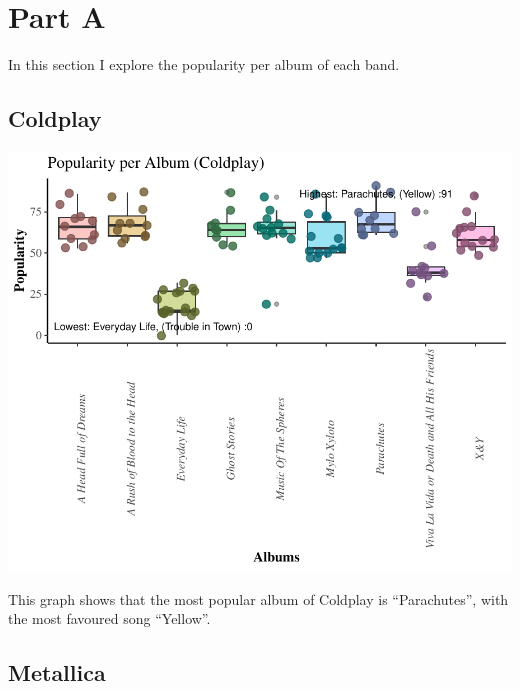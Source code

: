 \documentclass[11pt,preprint, authoryear]{elsarticle}
\numberwithin{equation}{section}
\numberwithin{figure}{section}
\numberwithin{table}{section}
\begin{document}
\hypertarget{part-a}{%
\section{Part A}\label{part-a}}

In this section I explore the popularity per album of each band.

\hypertarget{coldplay}{%
\subsection{Coldplay}\label{coldplay}}

\includegraphics{Question3_files/figure-latex/unnamed-chunk-1-1.pdf}

This graph shows that the most popular album of Coldplay is
``Parachutes'', with the most favoured song ``Yellow''.

\hypertarget{metallica}{%
\subsection{Metallica}\label{metallica}}
\end{document}
